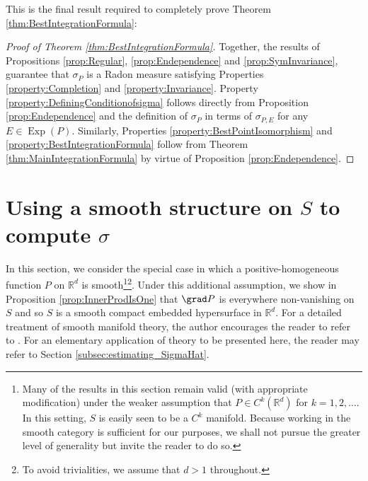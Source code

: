 \documentclass[11pt, letter]{book}
\newcommand\Exp{\operatorname{Exp}}
\begin{document}
\noindent This is the final result required to completely prove Theorem \ref{thm:BestIntegrationFormula}:



\begin{proof}[Proof of Theorem \ref{thm:BestIntegrationFormula}]
Together, the results of Propositions \ref{prop:Regular}, \ref{prop:Endependence} and \ref{prop:SymInvariance}, guarantee that $\sigma_P$ is a Radon measure satisfying Properties \ref{property:Completion} and \ref{property:Invariance}. Property \ref{property:DefiningConditionofsigma} follows directly from Proposition \ref{prop:Endependence} and the definition of $\sigma_P$ in terms of $\sigma_{P,E}$ for any $E\in\Exp(P)$. Similarly, Properties \ref{property:BestPointIsomorphism} and \ref{property:BestIntegrationFormula} follow from Theorem \ref{thm:MainIntegrationFormula} by virtue of Proposition \ref{prop:Endependence}. 
\end{proof}









\section{Using a smooth structure on $S$ to compute $\sigma$}\label{sec:smooth_manifold}


\noindent In this section, we consider the special case in which a positive-homogeneous function $P$ on $\mathbb{R}^d$ is smooth\footnote{Many of the results in this section remain valid (with appropriate modification) under the weaker assumption that $P\in C^k(\mathbb{R}^d)$ for $k=1,2,\dots$. In this setting, $S$ is easily seen to be a $C^k$ manifold. Because working in the smooth category is sufficient for our purposes, we shall not pursue the greater level of generality but invite the reader to do so.}\footnote{{To avoid trivialities, we assume that $d>1$ throughout.}}.
Under this additional assumption, we show in Proposition \ref{prop:InnerProdIsOne} that $\grad P$ is everywhere non-vanishing on $S$ and so $S$ is a smooth compact embedded hypersurface in $\mathbb{R}^d$. For a detailed treatment of smooth manifold theory, the author encourages the reader to refer to \cite{lee_introduction_2003}. For an elementary application of theory to be presented here, the reader may refer to Section \ref{subsec:estimating_SigmaHat}.\\
\end{document}

